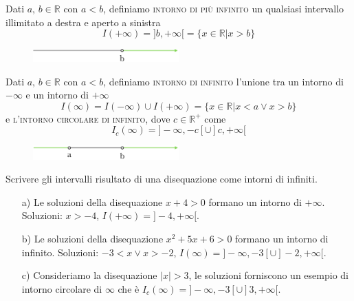 \begin{definizione}
  Dati $a,\,b\in\mathbb{R}$ con $a<b$, definiamo \textsc{intorno di più 
infinito} un qualsiasi intervallo illimitato a destra e aperto a sinistra
\begin{equation}
  I(+\infty)=]b,+\infty[=\{x\in\mathbb{R}\vert x>b\}
\end{equation}
\end{definizione}

\begin{figure}[htpb!]
  \centering
  \includegraphics[width=0.5\textwidth]{img/top_5.png}%
\end{figure}

\begin{definizione}
  Dati $a,\,b\in\mathbb{R}$ con $a<b$, definiamo \textsc{intorno di 
infinito} l'unione tra un intorno di $-\infty$  e un intorno di $+\infty$ 
\begin{equation}
  I(\infty)=I(-\infty)\cup I(+\infty)=\{x\in\mathbb{R}\vert x<a \lor 
x>b\}
\end{equation}
e \textsc{l'intorno circolare di infinito}, dove $c\in\mathbb{R}^+$ come
\begin{equation}
  I_c(\infty)=]-\infty,-c[\cup]c,+\infty[
\end{equation}
\end{definizione}

\begin{figure}[htpb!]
  \centering
  \includegraphics[width=0.5\textwidth]{img/top_6.png}%
\end{figure}


\begin{esempio} Scrivere gli intervalli risultato di una disequazione come 
intorni di infiniti.
\begin{itemize}
  \item[a)] Le soluzioni della disequazione $x+4>0$ formano un intorno 
di $+\infty$.  Soluzioni: $x>-4$, $I(+\infty)=]-4, +\infty[$.\\
  \item[b)] Le soluzioni della disequazione $x^2+5x+6>0$ formano un 
intorno di infinito. Soluzioni: $-3<x\lor x>-2$, $I(\infty)=]-\infty, -3[ 
\cup]-2, +\infty[$.\\
  \item[c)] Consideriamo la disequazione $\vert x\vert>3$, le soluzioni 
forniscono un esempio di intorno circolare di $\infty$ che è 
$I_c(\infty)=]-\infty,-3[\cup]3,+\infty[$.
\end{itemize} 
\end{esempio}

